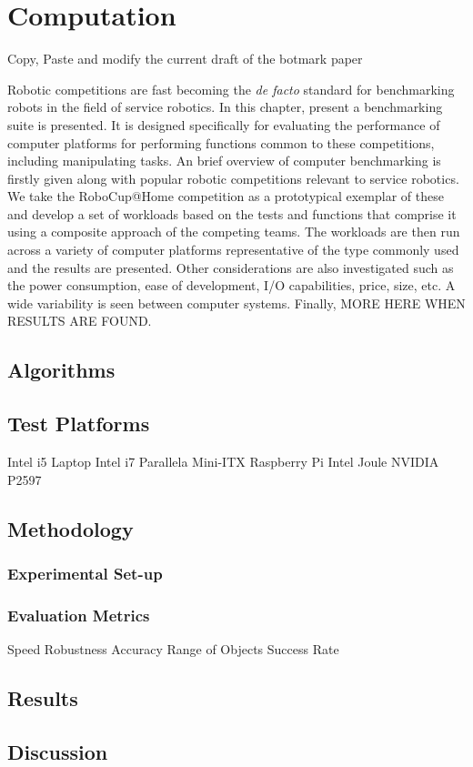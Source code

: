 \chapter{Computation}

Copy, Paste and modify the current draft of the botmark paper



Robotic competitions are fast becoming the \textit{de facto} standard for benchmarking robots in the field of service robotics. In this chapter, present a benchmarking suite is presented. It is designed specifically for evaluating the performance of computer platforms for performing functions common to these competitions, including manipulating tasks. An brief overview of computer benchmarking is firstly given along with popular robotic competitions relevant to service robotics. We take the RoboCup@Home competition as a prototypical exemplar of these  and develop a set of workloads based on the tests and functions that comprise it using a composite approach of the competing teams. The workloads are then run across a variety of computer platforms representative of the type commonly used and the results are presented. Other considerations are also investigated such as the power consumption, ease of development, I/O capabilities, price, size, etc. A wide variability is seen between computer systems. Finally, MORE HERE WHEN RESULTS ARE FOUND.


\section{Algorithms}

\section{Test Platforms}

Intel i5 Laptop 
Intel i7 
Parallela
Mini-ITX
Raspberry Pi
Intel Joule
NVIDIA P2597

\section{Methodology}
\subsection{Experimental Set-up}
\subsection{Evaluation Metrics}
Speed
Robustness
Accuracy
Range of Objects
Success Rate

\section{Results}


\section{Discussion}






